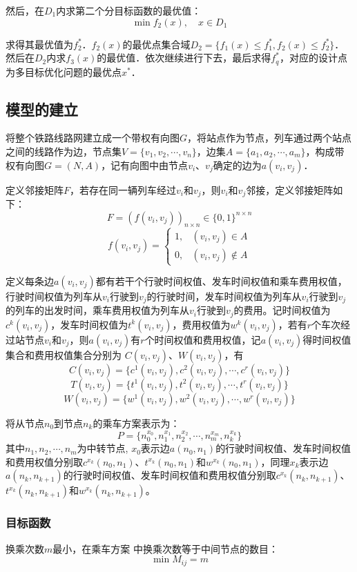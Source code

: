 \documentclass[UTF8]{ctexart}
\begin{document}
然后，在$D_1$内求第二个分目标函数的最优值：
$$\min f_2(x), \quad x \in D_1$$

求得其最优值为$f_2^*$．$f_2(x)$的最优点集合域$D_2 = \{f_1(x)\leq f_1^*, f_2(x)\leq f_2^*\}$． 然后在$D_2$内求$f_3(x)$的最优值．依次继续进行下去，最后求得$f_q^*$，对应的设计点为多目标优化问题的最优点$x^*$．

\subsection{模型的建立}
将整个铁路线路网建立成一个带权有向图$G$，将站点作为节点，列车通过两个站点之间的线路作为边，节点集$V = \{v_1,v_2,\cdots,v_n\}$，边集$A = \{a_1,a_2,\cdots,a_m\}$，构成带权有向图$G = (N,A)$，记有向图中由节点$v_i$、$v_j$确定的边为$a(v_i,v_j)$．

定义邻接矩阵$F$，若存在同一辆列车经过$v_i$和$v_j$，则$v_i$和$v_j$邻接，定义邻接矩阵如下：
$$F = (f(v_i,v_j))_{n\times n} \in \{0,1\}^{n \times n}$$
\[f(v_i,v_j) = \begin{cases}
1, & (v_i,v_j) \in A \\
0, & (v_i,v_j) \notin A
\end{cases}\]

定义每条边$a(v_i,v_j)$都有若干个行驶时间权值、发车时间权值和乘车费用权值，行驶时间权值为列车从$v_i$行驶到$v_j$的行驶时间，发车时间权值为列车从$v_i$行驶到$v_j$的列车的出发时间，乘车费用权值为列车从$v_i$行驶到$v_j$的费用。记时间权值为$c^k(v_i,v_j)$，发车时间权值为$t^k(v_i,v_j)$，费用权值为$w^k(v_i,v_j)$，若有$r$个车次经过站节点$v_i$和$v_j$，则$a(v_i,v_j)$有$r$个时间权值和费用权值，记$a(v_i,v_j)$得时间权值集合和费用权值集合分别为 $C(v_i,v_j)$、$W(v_i,v_j)$，有
\[C(v_i,v_j) = \{c^1(v_i,v_j),c^2(v_i,v_j),\cdots,c^r(v_i,v_j)\}\]
\[T(v_i,v_j) = \{t^1(v_i,v_j),t^2(v_i,v_j),\cdots,t^r(v_i,v_j)\}\]
\[W(v_i,v_j) = \{w^1(v_i,v_j),w^2(v_i,v_j), \cdots, w^r(v_i,v_j)\}\]

 将从节点$n_0$到节点$n_k$的乘车方案表示为：
  \[P = \{n_0^{x_0}, n_1^{x_1}, n_2^{x_2}, \cdots,n_m^{x_m},n_k^{x_k}\}\]
 其中$n_1,n_2,\cdots,n_m$为中转节点, $x_0$表示边$a(n_0,n_1)$的行驶时间权值、发车时间权值和费用权值分别取$c^{x_k}(n_0,n_1)$、$t^{x_k}(n_0,n_1)$和$w^{x_k}(n_0,n_1)$，同理$x_k$表示边$a(n_k,n_{k+1})$的行驶时间权值、发车时间权值和费用权值分别取$c^{x_k}(n_k,n_{k+1})$、$t^{x_k}(n_k,n_{k+1})$和$w^{x_k}(n_k,n_{k+1})$。
 
 \subsubsection{目标函数}
 换乘次数$m$最小，在乘车方案 中换乘次数等于中间节点的数目：
 \[\min M_{ij} = m\]
 
\end{document}
